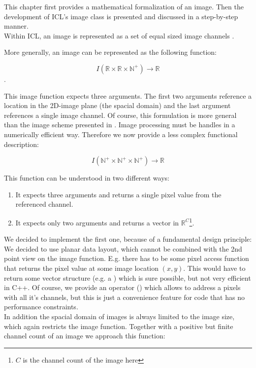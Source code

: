 This chapter first provides a mathematical formalization of an image. Then the development of ICL's image class is presented and discussed in a step-by-step manner.\\
Within ICL, an image is represented as a set of equal sized image channels . 



More generally, an image can be represented as the following function:

\begin{equation}
I(\mathbb{R} \times{} \mathbb{R} \times{} \mathbb{N^+} )\rightarrow\mathbb{R} 
\end{equation}.

This image function expects three arguments. The first two arguments reference a location in the 2D-image plane (the spacial domain) and the last argument references a single image channel. Of course, this formulation is more  general than the image scheme presented in . Image processing must be handles in a numerically efficient way. Therefore we now provide a less complex functional description:

\begin{equation}
  I(\mathbb{N^+} \times{} \mathbb{N^+} \times{} \mathbb{N^+} )\rightarrow\mathbb{R} 
\end{equation}


This function can be understood in two different ways:
\begin{enumerate}
 \item It expects three arguments and returns a single pixel value from the referenced channel.
 \item It expects only two arguments and returns a vector in $\mathbb{R}^C$\footnote{$C$ is the channel count of the image here}.
\end{enumerate} 


We decided to implement the first one, because of a fundamental design principle: We decided to use planar data layout, which cannot be combined with the 2nd point view on the image function. E.g. there has to be some pixel access function that returns the pixel value at some image location $(x,y)$. This would have to return some vector structure (e.g. a ) which is sure possible, but not very efficient in C++.
Of course, we provide an operator () which allows to address a pixels with all it's channels, but this is just a convenience feature for code that has no performance constraints.\\
In addition the spacial domain of images is always limited to the image size, which again restricts the image function. Together with a positive but finite channel count of an image we approach this function:

